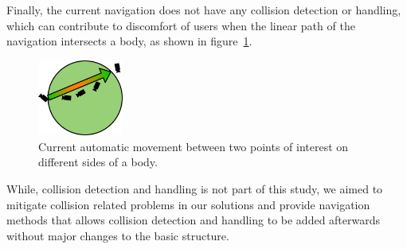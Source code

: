 Finally, the current navigation does not have any collision detection or handling, which can contribute to discomfort
of users when the linear path of the navigation intersects a body, as shown in figure~\ref{fig:old-auto-nav-collision}.

\begin{figure}[h]
    \centering
    \includegraphics[width=0.25\textwidth]{content/3_current_state/img/OldAutomaticNavigation_SurfaceCollision}
    \caption{Current automatic movement between two points of interest on different sides of a body.}
    \label{fig:old-auto-nav-collision}
\end{figure}

While, collision detection and handling is not part of this study, we aimed to mitigate collision related problems in
our solutions and provide navigation methods that allows collision detection and handling to be added afterwards
without major changes to the basic structure.
